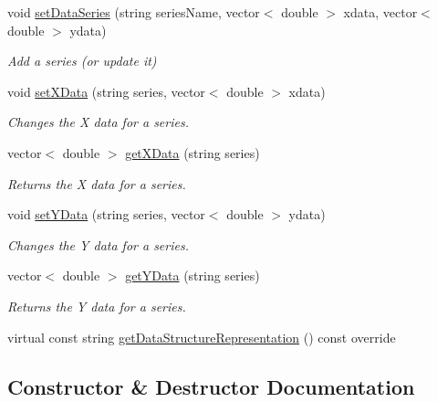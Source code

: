 \begin{DoxyCompactItemize}
void \hyperlink{classbridges_1_1datastructure_1_1_line_chart_acb763ea4b2d0f27c73edc3861cc51fbb}{set\+Data\+Series} (string series\+Name, vector$<$ double $>$ xdata, vector$<$ double $>$ ydata)
\begin{DoxyCompactList}\small\item\em Add a series (or update it) \end{DoxyCompactList}\item 
void \hyperlink{classbridges_1_1datastructure_1_1_line_chart_aa9959489d71e31645f561c4481f050d2}{set\+X\+Data} (string series, vector$<$ double $>$ xdata)
\begin{DoxyCompactList}\small\item\em Changes the X data for a series. \end{DoxyCompactList}\item 
vector$<$ double $>$ \hyperlink{classbridges_1_1datastructure_1_1_line_chart_af624657af0ddd7d58c1d9290b4874280}{get\+X\+Data} (string series)
\begin{DoxyCompactList}\small\item\em Returns the X data for a series. \end{DoxyCompactList}\item 
void \hyperlink{classbridges_1_1datastructure_1_1_line_chart_a861370f3f7b32cc1a9347727d084d307}{set\+Y\+Data} (string series, vector$<$ double $>$ ydata)
\begin{DoxyCompactList}\small\item\em Changes the Y data for a series. \end{DoxyCompactList}\item 
vector$<$ double $>$ \hyperlink{classbridges_1_1datastructure_1_1_line_chart_a6a895cf47836585f8415e4d29e092085}{get\+Y\+Data} (string series)
\begin{DoxyCompactList}\small\item\em Returns the Y data for a series. \end{DoxyCompactList}\item 
virtual const string \hyperlink{classbridges_1_1datastructure_1_1_line_chart_a1e032b058e13ea08a449516698f438ac}{get\+Data\+Structure\+Representation} () const override
\end{DoxyCompactItemize}


\subsection{Constructor \& Destructor Documentation}
\mbox{\label{classbridges_1_1datastructure_1_1_line_chart_ab96c0639aca0d08c19e5d3b51a29b0a6}} 
